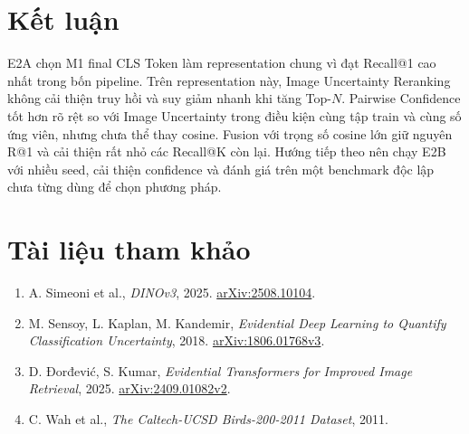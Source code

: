 \documentclass[11pt,a4paper]{article}
\begin{document}
\section{Kết luận}
E2A chọn M1 final CLS Token làm representation chung vì đạt Recall@1 cao nhất
trong bốn pipeline. Trên representation này, Image Uncertainty Reranking không
cải thiện truy hồi và suy giảm nhanh khi tăng Top-$N$. Pairwise Confidence
tốt hơn rõ rệt so với Image Uncertainty trong điều kiện cùng tập train và cùng
số ứng viên, nhưng chưa thể thay cosine.
Fusion với trọng số cosine lớn giữ nguyên R@1 và cải thiện rất nhỏ các Recall@K
còn lại. Hướng tiếp theo nên chạy E2B với nhiều seed, cải thiện confidence và
đánh giá trên một benchmark độc lập chưa từng dùng để chọn phương pháp.

\section*{Tài liệu tham khảo}
\begin{enumerate}
  \item A. Simeoni et al., \emph{DINOv3}, 2025.
  \href{https://arxiv.org/abs/2508.10104}{arXiv:2508.10104}.
  \item M. Sensoy, L. Kaplan, M. Kandemir, \emph{Evidential Deep Learning to
  Quantify Classification Uncertainty}, 2018.
  \href{https://arxiv.org/abs/1806.01768v3}{arXiv:1806.01768v3}.
  \item D. Đorđević, S. Kumar, \emph{Evidential Transformers for Improved
  Image Retrieval}, 2025.
  \href{https://arxiv.org/abs/2409.01082v2}{arXiv:2409.01082v2}.
  \item C. Wah et al., \emph{The Caltech-UCSD Birds-200-2011 Dataset}, 2011.
\end{enumerate}
\end{document}
